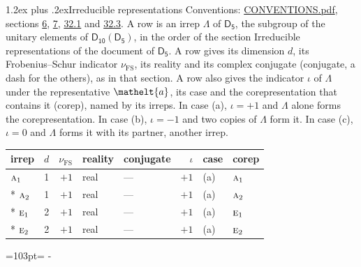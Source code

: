\documentclass[10pt,a4paper]{article}
\makeatletter
\renewcommand\section{\@startsection{section}{1}{\z@}{-3ex plus -1ex minus -.2ex}%
  {1.2ex plus .2ex}{\normalfont\large\sffamily\bfseries\color{parttitle}}}
\newcommand{\needspace}[1]{\par\penalty-100\begingroup\dimen0=#1\relax\dimen2=\pagegoal
  \advance\dimen2-\pagetotal\ifdim\dimen0>\dimen2\relax\ifdim\dimen2>0pt\vfil\break\fi\fi
  \endgroup}
\numberwithin{equation}{section}
\newcommand{\eltfont}[1]{{\let\sigma\eltsigma\mathelt{#1}}}
\newcommand{\grp}[1]{\mathsf{#1}}
\newcommand{\irr}[1]{\text{\normalfont\scshape #1}}
\newcommand{\elt}[1]{\eltfont{#1}}
\newcommand{\fsind}{\nu_{\mathrm{FS}}}
\makeatother
\begin{document}
\section{Irreducible representations}\label{s:irreps}
Conventions: \href{../../CONVENTIONS.pdf}{CONVENTIONS.pdf}, sections \href{../../../rotation/CONVENTIONS.pdf\#conv.6}{6}, \href{../../../rotation/CONVENTIONS.pdf\#conv.7}{7}, \href{../../CONVENTIONS.pdf\#conv.32.1}{32.1} and \href{../../CONVENTIONS.pdf\#conv.32.3}{32.3}.
\leavevmode\label{n:irrep.Delta}A row is an irrep $\Lambda$ of $\grp{D_{5}}$, the subgroup of the unitary elements of $\grp{D_{10}}(\grp{D_{5}})$, in the order of the section Irreducible representations of the document of \href{../../../rotation/data/pdf/D5.pdf}{$\grp{D_{5}}$}. \label{n:index.dimension}\label{n:index.frobenius}\label{n:head.irrep}\label{n:head.reality}\label{n:head.conjugate}A row gives its dimension $d$, its Frobenius--Schur indicator $\fsind$, its reality and its complex conjugate (conjugate, a dash for the others), as in that section. \label{n:head.case.corep}\label{n:head.corep}A row also gives the indicator $\iota$ of $\Lambda$ under the representative $\elt{a}$, its case and the corepresentation that contains it (corep), named by its irreps. In case (a), $\iota = +1$ and $\Lambda$ alone forms the corepresentation. In case (b), $\iota = -1$ and two copies of $\Lambda$ form it. In case (c), $\iota = 0$ and $\Lambda$ forms it with its partner, another irrep.
\setlength{\emergencystretch}{2em}\par\setlength{\emergencystretch}{0pt}
{\small\renewcommand{\arraystretch}{1.25}\setlength{\tabcolsep}{4pt}\begin{longtable}{@{}lrrllrll@{}}\toprule
irrep & $d$ & $\fsind$ & reality & conjugate & $\iota$ & case & corep\\\midrule\endhead
\bottomrule\endfoot\endlastfoot
$\irr{a}_{1}$ & 1 & $+1$ & real & --- & $+1$ & (a) & $\irr{a}_{1}$\\*
$\irr{a}_{2}$ & 1 & $+1$ & real & --- & $+1$ & (a) & $\irr{a}_{2}$\\*
$\irr{e}_{1}$ & 2 & $+1$ & real & --- & $+1$ & (a) & $\irr{e}_{1}$\\*
$\irr{e}_{2}$ & 2 & $+1$ & real & --- & $+1$ & (a) & $\irr{e}_{2}$\\
\bottomrule\end{longtable}}
\needspace{103pt}
\end{document}
